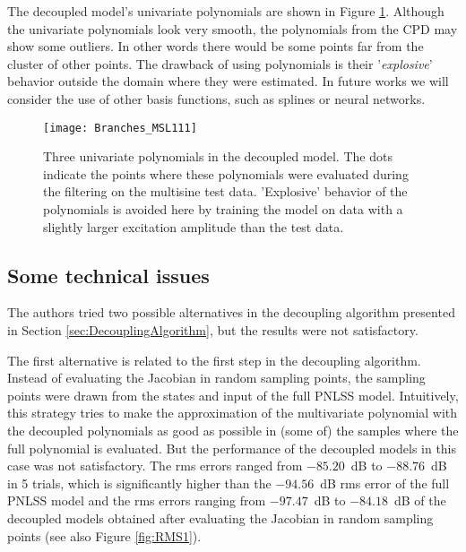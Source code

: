\documentclass[review]{elsarticle}
\begin{document}
The decoupled model's univariate polynomials are shown in Figure \ref{fig:Br}. Although the univariate polynomials look very smooth, the polynomials from the CPD may show some outliers. In other words there would be some points far from the cluster of other points. The drawback of using polynomials is their '\textit{explosive}' behavior outside the domain where they were estimated. In future works we will consider the use of other basis functions, such as splines or neural networks.

\begin{figure}[ht]
\begin{center}
\texttt{[image: Branches\_MSL111]}    %
\caption{Three univariate polynomials in the decoupled model. The dots indicate the points where these polynomials were evaluated during the filtering on the multisine test data.
'Explosive' behavior of the polynomials is avoided here by training the model on data with a slightly larger excitation amplitude than the test data.} 
\label{fig:Br}
\end{center}
\end{figure}
\subsection{Some technical issues}\label{SubSec:TechIss}
The authors tried two possible alternatives in the decoupling algorithm presented in Section \ref{sec:DecouplingAlgorithm}, but the results were not satisfactory.

The first alternative is related to the first step in the decoupling algorithm. Instead of evaluating the Jacobian in random sampling points, the sampling points were drawn from the states and input of the full PNLSS model. 
Intuitively, this strategy tries to make the approximation of the multivariate polynomial with the decoupled polynomials as good as possible in (some of) the samples where the full polynomial is evaluated. But the performance of the decoupled models in this case was not satisfactory. The rms errors ranged from $-85.20$~dB to $-88.76$~dB in 5 trials, which is significantly higher than the $-94.56$~dB rms error of the full PNLSS model and the rms errors ranging from $-97.47$~dB to $-84.18$~dB of the decoupled models obtained after evaluating the Jacobian in random sampling points (see also Figure \ref{fig:RMS1}).
\end{document}
